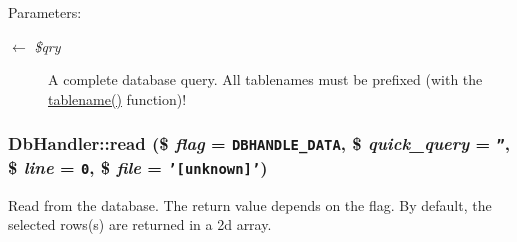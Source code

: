 \begin{Desc}
\item[Parameters:]
\begin{description}
\item[\mbox{$\leftarrow$} {\em \$qry}]A complete database query. All tablenames must be prefixed (with the \hyperlink{classDbHandler_baca15a312800e5522b3efd9dff036f5}{tablename()} function)! \end{description}
\end{Desc}
\hypertarget{classDbHandler_fb193ff3fde35c7968d2e2fe4f8546be}{
\subsubsection{\setlength{\rightskip}{0pt plus 5cm}DbHandler::read (\$ {\em flag} = {\tt {\bf DBHANDLE\_\-DATA}}, \$ {\em quick\_\-query} = {\tt ''}, \$ {\em line} = {\tt 0}, \$ {\em file} = {\tt '\mbox{[}unknown\mbox{]}'})}}
\label{classDbHandler_fb193ff3fde35c7968d2e2fe4f8546be}


Read from the database. The return value depends on the flag. By default, the selected rows(s) are returned in a 2d array.

